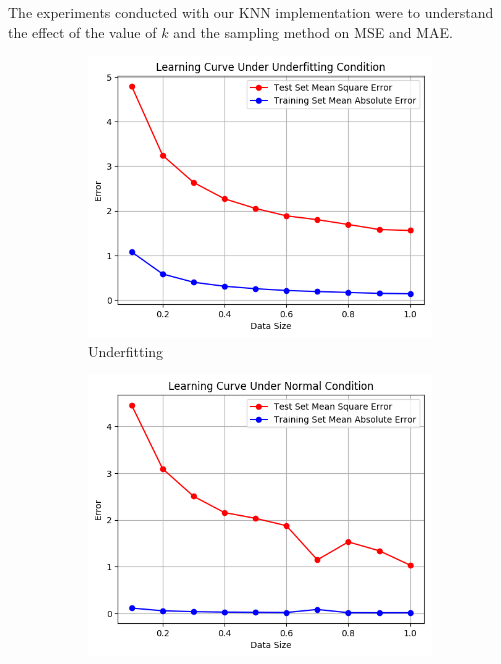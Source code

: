 \documentclass[10pt]{article}
\begin{document}
The experiments conducted with our KNN implementation were to understand the effect of the value of $k$ and the sampling method on MSE and MAE.
\begin{figure}[t]
    \centering
    \begin{subfigure}{0.33\textwidth}
      \centering
      \includegraphics[width=1\textwidth]{Learning_Curve_Under_Underfitting_Condition}
      \caption{Underfitting}
      \label{fig:Underfitting}
    \end{subfigure}%
    \begin{subfigure}{0.33\textwidth}
      \centering
      \includegraphics[width=1\textwidth]{Learning_Curve_Under_Normal_Condition}

\end{subfigure}
\end{figure}
\end{document}
